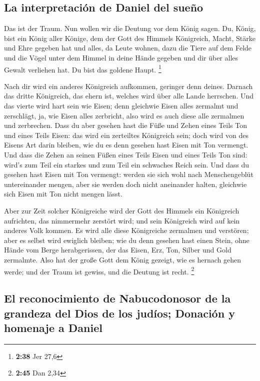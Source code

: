 \hypertarget{la-interpretaciuxf3n-de-daniel-del-sueuxf1o}{%
\subsection{La interpretación de Daniel del
sueño}\label{la-interpretaciuxf3n-de-daniel-del-sueuxf1o}}

 Das ist der Traum. Nun wollen wir die Deutung vor dem
König sagen.  Du, König, bist ein König aller Könige, dem
der Gott des Himmels Königreich, Macht, Stärke und Ehre gegeben hat
 und alles, da Leute wohnen, dazu die Tiere auf dem Felde
und die Vögel unter dem Himmel in deine Hände gegeben und dir über alles
Gewalt verliehen hat. Du bist das goldene Haupt. \footnote{\textbf{2:38}
  Jer 27,6}

 Nach dir wird ein anderes Königreich aufkommen, geringer
denn deines. Darnach das dritte Königreich, das ehern ist, welches wird
über alle Lande herrschen.  Und das vierte wird hart sein
wie Eisen; denn gleichwie Eisen alles zermalmt und zerschlägt, ja, wie
Eisen alles zerbricht, also wird es auch diese alle zermalmen und
zerbrechen.  Dass du aber gesehen hast die Füße und Zehen
eines Teils Ton und eines Teils Eisen: das wird ein zerteiltes
Königreich sein; doch wird von des Eisens Art darin bleiben, wie du es
denn gesehen hast Eisen mit Ton vermengt.  Und dass die
Zehen an seinen Füßen eines Teils Eisen und eines Teils Ton sind: wird's
zum Teil ein starkes und zum Teil ein schwaches Reich sein.
 Und dass du gesehen hast Eisen mit Ton vermengt: werden
sie sich wohl nach Menschengeblüt untereinander mengen, aber sie werden
doch nicht aneinander halten, gleichwie sich Eisen mit Ton nicht mengen
lässt.

 Aber zur Zeit solcher Königreiche wird der Gott des
Himmels ein Königreich aufrichten, das nimmermehr zerstört wird; und
sein Königreich wird auf kein anderes Volk kommen. Es wird alle diese
Königreiche zermalmen und verstören; aber es selbst wird ewiglich
bleiben;  wie du denn gesehen hast einen Stein, ohne
Hände vom Berge herabgerissen, der das Eisen, Erz, Ton, Silber und Gold
zermalmte. Also hat der große Gott dem König gezeigt, wie es hernach
gehen werde; und der Traum ist gewiss, und die Deutung ist recht.
\footnote{\textbf{2:45} Dan 2,34}

\hypertarget{el-reconocimiento-de-nabucodonosor-de-la-grandeza-del-dios-de-los-juduxedos-donaciuxf3n-y-homenaje-a-daniel}{%
\subsection{El reconocimiento de Nabucodonosor de la grandeza del Dios
de los judíos; Donación y homenaje a
Daniel}\label{el-reconocimiento-de-nabucodonosor-de-la-grandeza-del-dios-de-los-juduxedos-donaciuxf3n-y-homenaje-a-daniel}}

